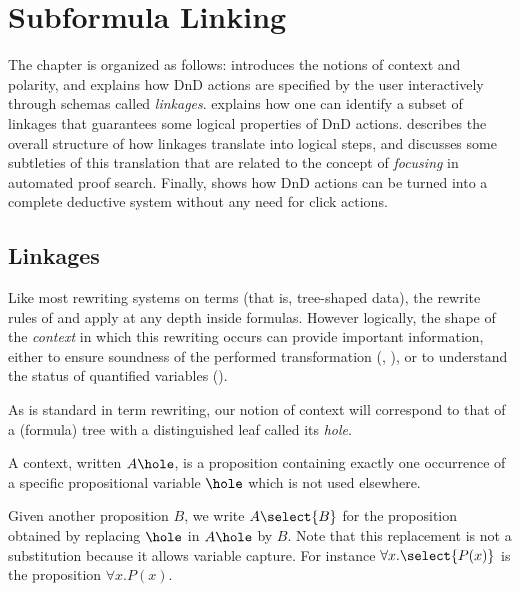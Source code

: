 \setchapterpreamble[u]{\margintoc}
\chapter{Subformula Linking}

The chapter is organized as follows:  introduces the notions of
context and polarity, and explains how DnD actions are specified by the user
interactively through schemas called \emph{linkages}.  explains
how one can identify a subset of linkages that guarantees some logical
properties of DnD actions.  describes the overall structure of
how linkages translate into logical steps, and  discusses some
subtleties of this translation that are related to the concept of
\emph{focusing} in automated proof search. Finally, 
shows how DnD actions can be turned into a complete deductive system without any
need for click actions.

\section{Linkages}

Like most rewriting systems on terms (that is, tree-shaped data), the rewrite
rules of  and  apply at any depth inside formulas.
However logically, the shape of the \emph{context} in which this rewriting
occurs can provide important information, either to ensure soundness of the
performed transformation (, ), or 
to understand the status of quantified variables ().

As is standard in term rewriting, our notion of context will correspond to that
of a (formula) tree with a distinguished leaf called its
\emph{hole}.

\begin{definition}[Context]\label{def:context}
  A context, written $A\hole$, is a proposition containing exactly
  one occurrence of a specific propositional variable $\hole$ which is
  not used elsewhere.

  Given another proposition $B$, we write $A\select{B}$ for the
  proposition obtained by replacing $\hole$ in $A\hole$ by $B$. Note
  that this replacement is not a substitution because it allows variable
  capture. For instance $\forall x.\select{P(x)}$ is the proposition
  $\forall x.P(x)$.
\end{definition}

